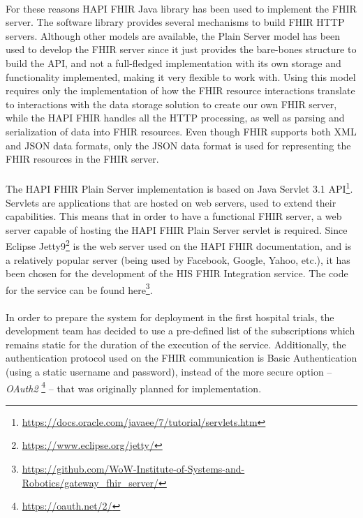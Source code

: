 \paragraph{} For these reasons HAPI FHIR Java library has been used to implement the \acs{FHIR} server. The software library provides several mechanisms to build \acs{FHIR} \acs{HTTP} servers. Although other models are available, the Plain Server model \cite{hapifhir} has been used to develop the \acs{FHIR} server since it just provides the bare-bones structure to build the \acs{API}, and not a full-fledged implementation with its own storage and functionality implemented, making it very flexible to work with. Using this model requires only the implementation of how the \acs{FHIR} resource interactions translate to interactions with the data storage solution to create our own \acs{FHIR} server, while the HAPI FHIR handles all the \acs{HTTP} processing, as well as parsing and serialization of data into \acs{FHIR} resources. Even though \acs{FHIR} supports both \acf{XML} and \acf{JSON} data formats, only the \acs{JSON} data format is used for representing the \acs{FHIR} resources in the \acs{FHIR} server.

\paragraph{} The HAPI FHIR Plain Server implementation is based on Java Servlet 3.1 \acs{API}\footnote{\url{https://docs.oracle.com/javaee/7/tutorial/servlets.htm}}. Servlets are applications that are hosted on web servers, used to extend their capabilities. This means that in order to have a functional \acs{FHIR} server, a web server capable of hosting the HAPI FHIR Plain Server servlet is required. Since Eclipse Jetty9\footnote{\url{https://www.eclipse.org/jetty/}} is the web server used on the HAPI FHIR documentation, and is a relatively popular server (being used by Facebook, Google, Yahoo, etc.), it has been chosen for the development of the \acs{HIS} \acs{FHIR} Integration service. The code for the service can be found here\footnote{\url{https://github.com/WoW-Institute-of-Systems-and-Robotics/gateway_fhir_server/}}.

\paragraph{} In order to prepare the system for deployment in the first hospital trials, the development team has decided to use a pre-defined list of the subscriptions which remains static for the duration of the execution of the service. Additionally, the authentication protocol used on the \acs{FHIR} communication is Basic Authentication (using a static username and password), instead of the more secure option -- \textit{OAuth2} \footnote{\url{https://oauth.net/2/}} -- that was originally planned for implementation.

